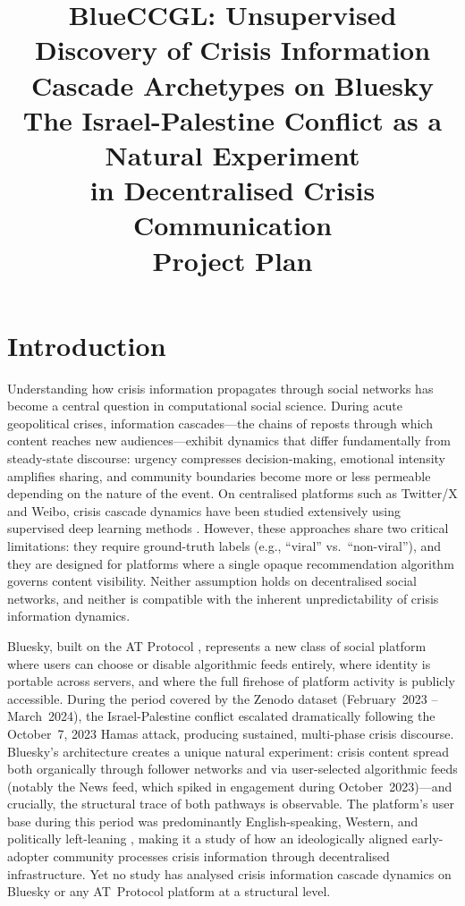 \documentclass[12pt,a4paper]{article}
\title{\textbf{BlueCCGL: Unsupervised Discovery of Crisis Information Cascade
       Archetypes on Bluesky}\\[6pt]
       \large The Israel-Palestine Conflict as a Natural Experiment\\
       in Decentralised Crisis Communication\\[6pt]
       \large Project Plan}
\author{}
\date{}
\begin{document}
\maketitle

\section{Introduction}

Understanding how crisis information propagates through social networks has
become a central question in computational social science.  During acute
geopolitical crises, information cascades---the chains of reposts through which
content reaches new audiences---exhibit dynamics that differ fundamentally from
steady-state discourse: urgency compresses decision-making, emotional intensity
amplifies sharing, and community boundaries become more or less permeable
depending on the nature of the event.  On centralised platforms such as
Twitter/X and Weibo, crisis cascade dynamics have been studied extensively
using supervised deep learning methods
\citep{chen2019cascn, cao2017deephawkes, yuan2024casflow}.  However, these
approaches share two critical limitations: they require ground-truth labels
(e.g., ``viral'' vs.\ ``non-viral''), and they are designed for platforms where
a single opaque recommendation algorithm governs content visibility.  Neither
assumption holds on decentralised social networks, and neither is compatible
with the inherent unpredictability of crisis information dynamics.

Bluesky, built on the AT Protocol \citep{kleppmann2024atprotocol}, represents a
new class of social platform where users can choose or disable algorithmic feeds
entirely, where identity is portable across servers, and where the full firehose
of platform activity is publicly accessible.  During the period covered by the
\citet{failla2024bluesky} Zenodo dataset (February~2023 -- March~2024), the
Israel-Palestine conflict escalated dramatically following the October~7, 2023
Hamas attack, producing sustained, multi-phase crisis discourse.  Bluesky's
architecture creates a unique natural experiment: crisis content spread both
organically through follower networks and via user-selected algorithmic feeds
(notably the News feed, which spiked in engagement during October~2023)---and
crucially, the structural trace of both pathways is observable.  The platform's
user base during this period was predominantly English-speaking, Western, and
politically left-leaning \citep{quelle2025bluesky}, making it a study of how an
ideologically aligned early-adopter community processes crisis information
through decentralised infrastructure.  Yet no study has analysed crisis
information cascade dynamics on Bluesky or any AT~Protocol platform at a
structural level.
\end{document}
